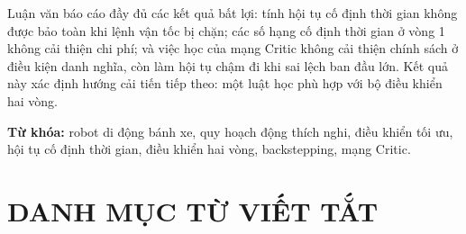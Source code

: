 \documentclass[12pt,a4paper]{article}
\begin{document}
Luận văn báo cáo đầy đủ các kết quả bất lợi: tính hội tụ cố định thời gian không được bảo toàn khi lệnh vận tốc bị chặn; các số hạng cố định thời gian ở vòng 1 không cải thiện chi phí; và việc học của mạng Critic không cải thiện chính sách ở điều kiện danh nghĩa, còn làm hội tụ chậm đi khi sai lệch ban đầu lớn. Kết quả này xác định hướng cải tiến tiếp theo: một luật học phù hợp với bộ điều khiển hai vòng.

\vspace{0.4cm}
\noindent\textbf{Từ khóa:} robot di động bánh xe, quy hoạch động thích nghi, điều khiển tối ưu, hội tụ cố định thời gian, điều khiển hai vòng, backstepping, mạng Critic.

\newpage
\tableofcontents

\newpage
{}
\listoffigures

\newpage
{}
\listoftables

\newpage
\section*{DANH MỤC TỪ VIẾT TẮT}
\end{document}
